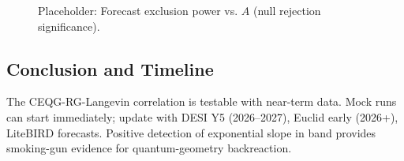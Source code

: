 \documentclass[12pt,a4paper]{article}
\begin{document}
\begin{figure}[h]
\centering
\caption{Placeholder: Forecast exclusion power vs. $A$ (null rejection significance).}
\label{fig:exclusion}
\end{figure}

\subsection{Conclusion and Timeline}
The CEQG-RG-Langevin correlation is testable with near-term data. Mock runs can start immediately; update with DESI Y5 (2026–2027), Euclid early (2026+), LiteBIRD forecasts. Positive detection of exponential slope in band provides smoking-gun evidence for quantum-geometry backreaction.
\end{document}
